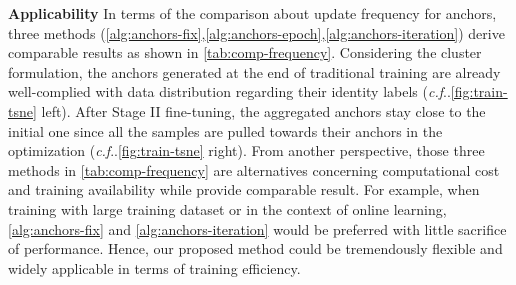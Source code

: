 \documentclass[runningheads]{llncs}
\makeatletter
\DeclareRobustCommand\onedot{\futurelet\@let@token\@onedot}
\def\@onedot{\ifx\@let@token.\else.\null\fi\xspace}
\def\cf{\emph{c.f}\onedot} \def\Cf{\emph{C.f}\onedot}
\makeatother
\begin{document}
\noindent\textbf{Applicability} In terms of the comparison about update frequency for anchors, three methods (\cref{alg:anchors-fix},\cref{alg:anchors-epoch},\cref{alg:anchors-iteration}) derive comparable results as shown in \cref{tab:comp-frequency}. Considering the cluster formulation, the anchors generated at the end of traditional training are already well-complied with data distribution regarding their identity labels (\cf \cref{fig:train-tsne} left). After Stage II fine-tuning, the aggregated anchors stay close to the initial one since all the samples are pulled towards their anchors in the optimization (\cf \cref{fig:train-tsne} right). From another perspective, those three methods in \cref{tab:comp-frequency} are alternatives concerning computational cost and training availability while provide comparable result. For example, when training with large training dataset or in the context of online learning, \cref{alg:anchors-fix} and \cref{alg:anchors-iteration} would be preferred with little sacrifice of performance. Hence, our proposed method could be tremendously flexible and widely applicable in terms of training efficiency.  

\begin{table}[t]
\vspace*{-0.18cm}
    \centering
    \caption{The performance of different models is evaluated on cross-domain datasets. Market1501  DukeMTMC means that we train the model on Market1501 and evaluate it on DukeMTMC-reID. () denotes the models trained and tested with input size .}
    \label{tab:cross-domain}
    \vspace*{-0.88cm}
\end{table}
\end{document}
